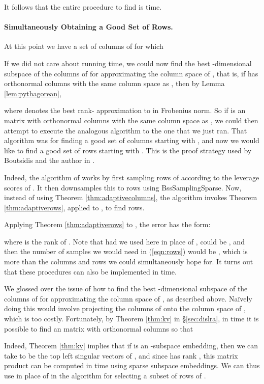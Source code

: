 \documentclass[11pt]{article}
\begin{document}
It follows that the entire procedure to find  is  time. 

\paragraph{Simultaneously Obtaining a Good Set of Rows.}
At this point we have a set  of  columns of  for which

If we did not care about running time, we could now find the best -dimensional subspace of the columns of
 for approximating the column space of , that is, if  has orthonormal columns with the
same column space as , then by Lemma \ref{lem:pythagorean},

where  denotes the best rank- approximation to  in Frobenius norm. So if
 is an  matrix with orthonormal columns with the same column space as 
, we could then attempt to execute the analogous algorithm to the one that 
we just ran. That algorithm was for finding a good
set of columns  starting with , and now we would like to find a good set  of rows 
starting with . This is the proof strategy used by Boutsidis and the author in \cite{BW14}. 

Indeed, the algorithm of \cite{BW14} works by first sampling  rows of  according
to the leverage scores of . It then downsamples this to  rows using {\textsc BssSamplingSparse}. Now,
instead of using Theorem \ref{thm:adaptivecolumns}, the algorithm invokes Theorem \ref{thm:adaptiverows}, applied to
, to find  rows. 

Applying Theorem \ref{thm:adaptiverows} to , the error has the form:

where  is the rank of . Note that had we used  here in place of ,  could be ,
and then the number  of samples we would need in (\ref{eqn:rows}) would be , which is more than
the  columns and  rows we could simultaneously hope for. It turns out that these procedures
can also be implemented in  time.

We glossed over the issue of how to find the best -dimensional subspace  of the columns of  for approximating
the column space of , as described above. Na\"ively doing this would involve projecting the columns of 
onto the column space of , which is too costly. Fortunately, by Theorem \ref{thm:kv}
in \S\ref{sec:dislra}, 
in  time it is 
possible to find an  matrix  with orthonormal columns so that

Indeed, Theorem \ref{thm:kv} implies that if  is an -subspace embedding, then we can take
 to be the top  left singular vectors of , and since  has rank ,
this matrix product can be computed in  time using sparse subspace embeddings.  
We can thus use  in place of  in the algorithm for selecting a subset of  rows of . 
\end{document}
